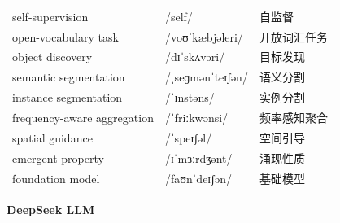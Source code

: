 \documentclass[UTF8,12pt,a4paper]{ctexart}
\providecommand{\zh}[1]{#1}
\begin{document}
\begin{tabular*}{\textwidth}{@{\extracolsep{\fill}}lll@{}}
self-supervision & {\ipafont /self/} & \zh{自监督} \\
open-vocabulary task & {\ipafont /voʊˈkæbjəleri/} & \zh{开放词汇任务} \\
object discovery & {\ipafont /dɪˈskʌvəri/} & \zh{目标发现} \\
semantic segmentation & {\ipafont /ˌseɡmənˈteɪʃən/} & \zh{语义分割} \\
instance segmentation & {\ipafont /ˈɪnstəns/} & \zh{实例分割} \\
frequency-aware aggregation & {\ipafont /ˈfriːkwənsi/} & \zh{频率感知聚合} \\
spatial guidance & {\ipafont /ˈspeɪʃəl/} & \zh{空间引导} \\
emergent property & {\ipafont /ɪˈmɜːrdʒənt/} & \zh{涌现性质} \\
foundation model & {\ipafont /faʊnˈdeɪʃən/} & \zh{基础模型} \\
\bottomrule
\end{tabular*}

\newpage

\begin{center}
    {\Large\bfseries DeepSeek LLM}
\end{center}
\end{document}
